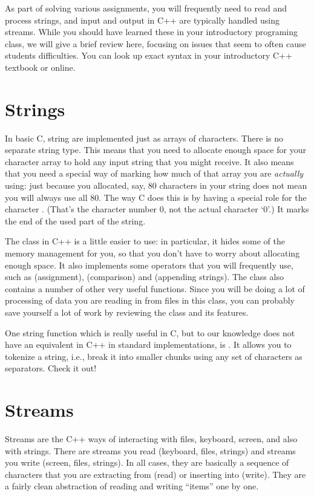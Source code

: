 As part of solving various assignments,
you will frequently need to read and process strings,
and input and output in C++ are typically handled using streams.
While you should have learned these in your introductory programing
class, we will give a brief review here, focusing on issues that seem
to often cause students difficulties.
You can look up exact syntax in your introductory C++ textbook or
online.

\section{Strings}
In basic C, string are implemented just as arrays of characters. 
There is no separate string type. 
This means that you need to allocate enough space for your character
array to hold any input string that you might receive.
It also means that you need a special way of marking how much of that
array you are \emph{actually} using: just because you allocated, say,
80 characters in your string does not mean you will always use all 80.
The way C does this is by having a special role for the character
.
(That's the character number 0, not the actual character `0'.)
It marks the end of the used part of the string.

The  class in C++ is a little easier to use:
in particular, it hides some of the memory management for you,
so that you don't have to worry about allocating enough space.
It also implements some operators that you will frequently use, such
as \code{=} (assignment), \code{==} (comparison) and \code{+}
(appending strings). 
The  class also contains a number of other very useful
functions. Since you will be doing a lot of processing of data you are
reading in from files in this class, you can probably save yourself a
lot of work by reviewing the  class and its features.

One string function which is really useful in C,
but to our knowledge does not have an equivalent in C++ in standard
implementations, is .
It allows you to tokenize a string, i.e., break it into smaller chunks
using any set of characters as separators.
Check it out!

\section{Streams}
Streams are the C++ ways of interacting with files, keyboard, screen,
and also with strings.
There are streams you read (keyboard, files, strings)
and streams you write (screen, files, strings).
In all cases, they are basically a sequence of characters
that you are extracting from (read) or inserting into (write).
They are a fairly clean abstraction of reading and writing ``items''
one by one.

